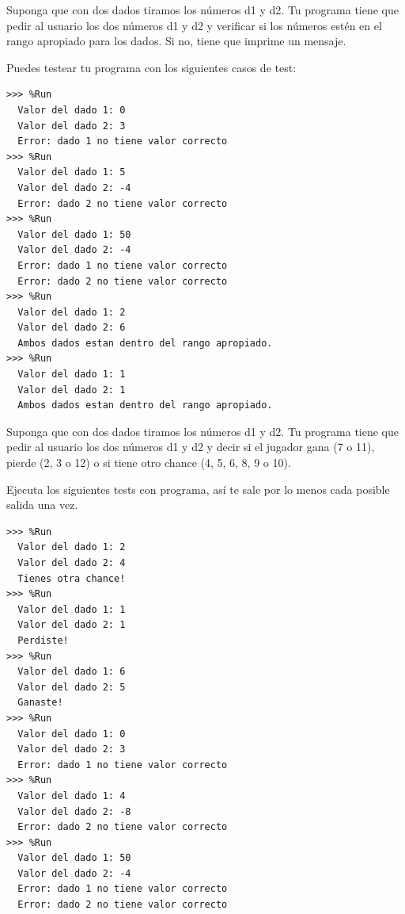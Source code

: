 \begin{ejercicio}\label{dados_rango}
Suponga que con dos dados tiramos los números d1 y d2. Tu programa tiene que pedir al usuario los dos números d1 y d2 y verificar si los números estén en el rango apropiado para los dados. Si no, tiene que imprime un mensaje.

Puedes testear tu programa con los siguientes casos de test:\\

\begin{Verbatim}[frame=single, label={\em example test execution of the program}]
>>> %Run 
  Valor del dado 1: 0
  Valor del dado 2: 3
  Error: dado 1 no tiene valor correcto
>>> %Run 
  Valor del dado 1: 5
  Valor del dado 2: -4
  Error: dado 2 no tiene valor correcto
>>> %Run 
  Valor del dado 1: 50
  Valor del dado 2: -4
  Error: dado 1 no tiene valor correcto
  Error: dado 2 no tiene valor correcto
>>> %Run 
  Valor del dado 1: 2
  Valor del dado 2: 6
  Ambos dados estan dentro del rango apropiado.
>>> %Run 
  Valor del dado 1: 1
  Valor del dado 2: 1
  Ambos dados estan dentro del rango apropiado.
\end{Verbatim}
\end{ejercicio}


\begin{ejercicio}\label{dados_rango_play}
Suponga que con dos dados tiramos los números d1 y d2. Tu programa tiene que pedir al usuario los dos números d1 y d2 y decir si el jugador gana (7 o 11), pierde (2, 3 o 12) o si tiene otro chance (4, 5, 6, 8, 9 o 10).

Ejecuta los siguientes tests con programa, así te sale por lo menos cada posible salida una vez.\\


\begin{Verbatim}[frame=single, label={\em example test execution of the program}]
>>> %Run 
  Valor del dado 1: 2
  Valor del dado 2: 4
  Tienes otra chance!
>>> %Run 
  Valor del dado 1: 1
  Valor del dado 2: 1
  Perdiste!
>>> %Run 
  Valor del dado 1: 6
  Valor del dado 2: 5
  Ganaste!
>>> %Run 
  Valor del dado 1: 0
  Valor del dado 2: 3
  Error: dado 1 no tiene valor correcto
>>> %Run 
  Valor del dado 1: 4
  Valor del dado 2: -8
  Error: dado 2 no tiene valor correcto
>>> %Run 
  Valor del dado 1: 50
  Valor del dado 2: -4
  Error: dado 1 no tiene valor correcto
  Error: dado 2 no tiene valor correcto
\end{Verbatim}
\end{ejercicio}



